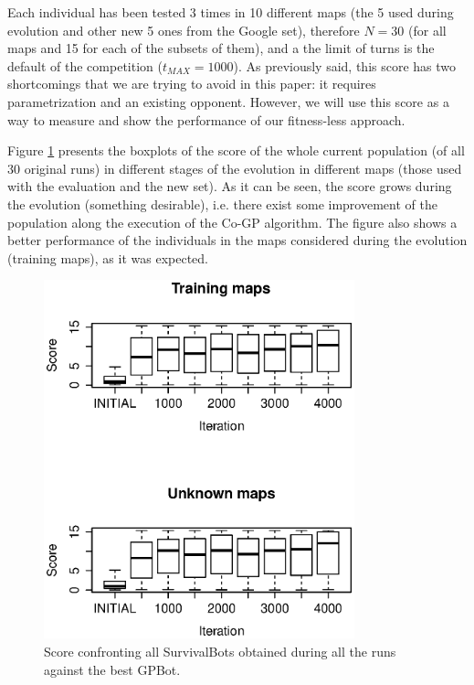 \documentclass[conference]{IEEEtran}
\begin{document}
Each individual has been tested 3 times in 10 different maps (the 5 used during evolution and other new 5 ones from the Google set), therefore $N=30$ (for all maps and 15 for each of the subsets of them), and a the limit of turns is the default of the competition ($t_{MAX}=1000$). As previously said, this score has two shortcomings that we are trying to avoid in this paper: it requires parametrization and an existing opponent. However, we will use this score as a way to measure and show the performance of our fitness-less approach.

Figure \ref{figura:Score_VS_GPBot} presents the boxplots of the score of the whole current population (of all 30 original runs) in different stages of the evolution in different maps (those used  with the evaluation and the new set). As it can be seen, the score grows during the evolution (something desirable), i.e. there exist some improvement of the population along the execution of the Co-GP algorithm. The figure also shows a better performance of the individuals in the maps considered during the evolution (training maps), as it was expected.

\begin{figure}[htb]
\tiny
\begin{center}
\includegraphics[clip=true,width=9cm]{./imags/score_vs_gpbot.eps}
\end{center}
\caption{Score confronting all SurvivalBots obtained during all the runs against the best GPBot.}
\label{figura:Score_VS_GPBot}
\end{figure}
\end{document}

